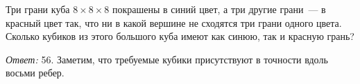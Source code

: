 \problem
Три грани куба $8 \times 8 \times 8$ покрашены в синий цвет, а три другие
грани~--- в красный цвет так, что ни в какой вершине не сходятся три грани
одного цвета.
Сколько кубиков из этого большого куба имеют как синюю, так и красную грань?

\solution
\emph{Ответ:} 56.
Заметим, что требуемые кубики присутствуют в точности вдоль восьми ребер.

\endproblem
